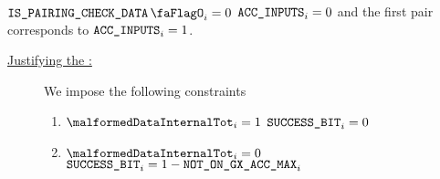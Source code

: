 \saNote{} \If $\isBlsPairingCheckData_{i} = 0$ \Then $\texttt{ACC\_INPUTS}_{i} = 0$ and the first pair corresponds to $\texttt{ACC\_INPUTS}_{i} = 1$.
\begin{description}
    \item[\underline{Justifying the \blsSuccessBit{}:}]
          We impose the following constraints
          \begin{enumerate}
              \item \If $\malformedDataInternalTot _{i}= 1$ \Then $\texttt{SUCCESS\_BIT} _{i} = 0$
              \item \If $\malformedDataInternalTot _{i}= 0$ \Then $\texttt{SUCCESS\_BIT}_{i} = 1 - \texttt{NOT\_ON\_GX\_ACC\_MAX} _{i}$
          \end{enumerate}
\end{description}
